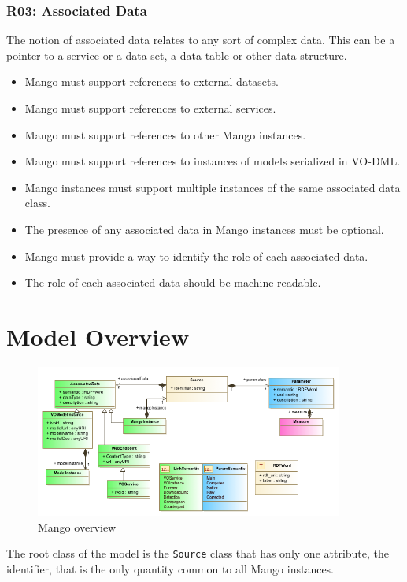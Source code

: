 \documentclass[11pt,a4paper]{ivoa}
\begin{document}
\subsubsection{R03: Associated Data}
The notion of associated data relates to any sort of complex data. This can be a pointer to a service or a data set, a data table or  other data structure.
\begin{itemize}
    \item Mango must support references to external datasets.
    \item Mango must support references to external services.
    \item Mango must support references to other Mango instances.
    \item Mango  must support references to instances of models serialized in VO-DML. 
    \item Mango instances must support multiple instances of the same associated data class.
    \item The presence of any associated data in Mango instances must be optional.
    \item Mango must provide a way to identify the role of each associated data.
    \item The role of each associated data should be machine-readable.
 \end{itemize}

\section{Model Overview}

\begin{figure}
\includegraphics[width=0.9\textwidth]{../model/overview_diagram.png}
\caption{Mango overview}
\label{fig:overview}
\end{figure}

The root class of the model is the \texttt{Source} class that has only one attribute, the identifier, that is the only quantity common to  all  Mango instances.
\end{document}
